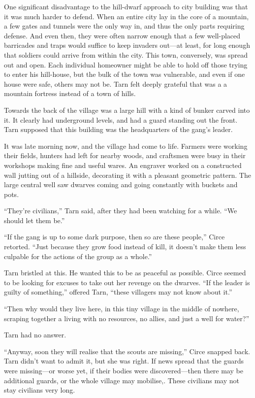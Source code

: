 One significant disadvantage to the hill-dwarf approach to city building was that it was much harder to defend.  When an entire city lay in the core of a mountain, a few gates and tunnels were the only way in, and thus the only parts requiring defense.  And even then, they were often narrow enough that a few well-placed barricades and traps would suffice to keep invaders out---at least, for long enough that soldiers could arrive from within the city.  This town, conversely, was spread out and open.  Each individual homeowner might be able to hold off those trying to enter his hill-house, but the bulk of the town was vulnerable, and even if one house were safe, others may not be.  Tarn felt deeply grateful that \korbarthrond was a a mountain fortress instead of a town of hills.

Towards the back of the village was a large hill with a kind of bunker carved into it.  It clearly had underground levels, and had a guard standing out the front.  Tarn supposed that this building was the headquarters of the gang's leader.

It was late morning now, and the village had come to life.  Farmers were working their fields, hunters had left for nearby woods, and craftsmen were busy in their workshops making fine and useful wares.  An engraver worked on a constructed wall jutting out of a hillside, decorating it with a pleasant geometric pattern.  The large central well saw dwarves coming and going constantly with buckets and pots.

``They're civilians,'' Tarn said, after they had been watching \tholkunrond for a while.  ``We should let them be.''

``If the gang is up to some dark purpose, then so are these people,'' Circe retorted.  ``Just because they grow food instead of kill, it doesn't make them less culpable for the actions of the group as a whole.''

Tarn bristled at this.  He wanted this to be as peaceful as possible.  Circe seemed to be looking for excuses to take out her revenge on the dwarves.  ``If the leader is guilty of something,'' offered Tarn, ``these villagers may not know about it.''

``Then why would they live here, in this tiny village in the middle of nowhere, scraping together a living with no resources, no allies, and just a well for water?''

Tarn had no answer.

``Anyway, soon they will realise that the scouts are missing,'' Circe snapped back.  Tarn didn't want to admit it, but she was right.  If news spread that the guards were missing---or worse yet, if their bodies were discovered---then there may be additional guards, or the whole village may mobilise,.  These civilians may not stay civilians very long.

